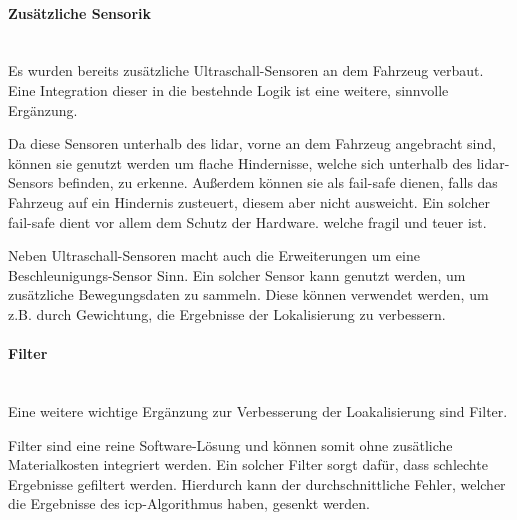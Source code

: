 \paragraph{Zusätzliche Sensorik} \mbox{}\\
Es wurden bereits zusätzliche Ultraschall-Sensoren an dem Fahrzeug verbaut.
Eine Integration dieser in die bestehnde Logik ist eine weitere, sinnvolle Ergänzung.

Da diese Sensoren unterhalb des \ac{lidar}, vorne an dem Fahrzeug angebracht sind,
können sie genutzt werden um flache Hindernisse, welche sich unterhalb des \ac{lidar}-Sensors befinden, zu erkenne.
Außerdem können sie als fail-safe dienen, falls das Fahrzeug auf ein Hindernis zusteuert, diesem aber nicht ausweicht.
Ein solcher fail-safe dient vor allem dem Schutz der Hardware. welche fragil und teuer ist.

Neben Ultraschall-Sensoren macht auch die Erweiterungen um eine Beschleunigungs-Sensor Sinn.
Ein solcher Sensor kann genutzt werden, um zusätzliche Bewegungsdaten zu sammeln.
Diese können verwendet werden, um z.B. durch Gewichtung, die Ergebnisse der Lokalisierung zu verbessern.

\paragraph{Filter} \mbox{}\\
Eine weitere wichtige Ergänzung zur Verbesserung der Loakalisierung sind Filter.

Filter sind eine reine Software-Lösung und können somit ohne zusätliche Materialkosten integriert werden.
Ein solcher Filter sorgt dafür, dass schlechte Ergebnisse gefiltert werden.
Hierdurch kann der durchschnittliche Fehler, welcher die Ergebnisse des \ac{icp}-Algorithmus haben, gesenkt werden.

\newpage
